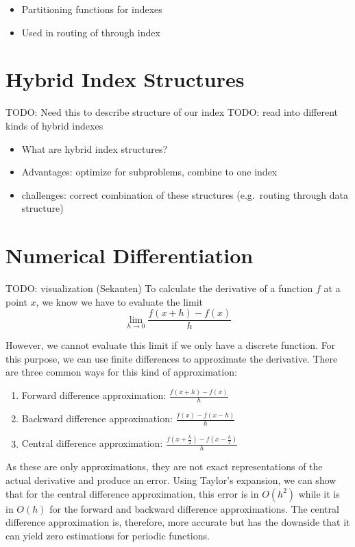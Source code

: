 \begin{itemize}
    \item Partitioning functions for indexes
    \item Used in routing of through index
\end{itemize}

\section{Hybrid Index Structures}\label{bg:hybrid}
TODO: Need this to describe structure of our index
TODO: read into different kinds of hybrid indexes
\begin{itemize}
    \item What are hybrid index structures?
    \item Advantages: optimize for subproblems, combine to one index
    \item challenges: correct combination of these structures (e.g.~routing through data structure)
\end{itemize}


\section{Numerical Differentiation}\label{bg:numerical}
TODO: visualization (Sekanten)
To calculate the derivative of a function $f$ at a point $x$, we know we have to evaluate the limit 
$$
\lim_{h \rightarrow 0} \frac{f(x+h) - f(x)}{h}
$$

However, we cannot evaluate this limit if we only have a discrete function. For this purpose, we can use finite differences to approximate the derivative. There are three common ways for this kind of approximation:
\begin{enumerate}
    \item Forward difference approximation: $\frac{f(x + h) - f(x)}{h}$
    \item Backward difference approximation: $\frac{f(x) - f(x-h)}{h}$
    \item Central difference approximation: $\frac{f(x + \frac{h}{2}) - f(x - \frac{h}{2})}{h}$
\end{enumerate}

As these are only approximations, they are not exact representations of the actual derivative and produce an error. Using Taylor's expansion, we can show that for the central difference approximation, this error is in $O(h^2)$ while it is in $O(h)$ for the forward and backward difference approximations. The central difference approximation is, therefore, more accurate but has the downside that it can yield zero estimations for periodic functions.

